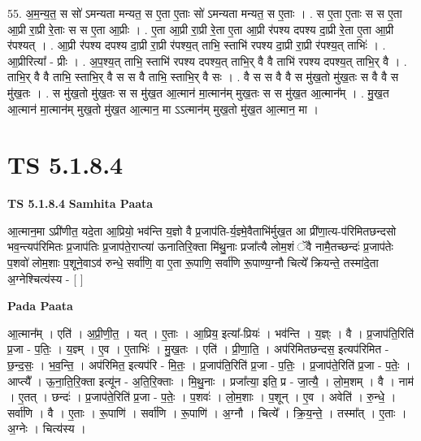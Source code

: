 \documentclass[17pt]{extarticle}
\begin{document}
55. अ॒म॒न्य॒त॒ स सो॑ ऽमन्यता मन्यत॒ स ए॒ता ए॒ताः सो॑ ऽमन्यता मन्यत॒ स ए॒ताः । . स ए॒ता ए॒ताः स स ए॒ता आ॒प्री रा॒प्री रे॒ताः स स ए॒ता आ॒प्रीः । . ए॒ता आ॒प्री रा॒प्री रे॒ता ए॒ता आ॒प्री र॑पश्य दपश्य दा॒प्री रे॒ता ए॒ता आ॒प्री र॑पश्यत् । . आ॒प्री र॑पश्य दपश्य दा॒प्री रा॒प्री र॑पश्य॒त् ताभि॒ स्ताभि॑ रपश्य दा॒प्री रा॒प्री र॑पश्य॒त् ताभिः॑ । . आ॒प्रीरित्या᳚ - प्रीः । . अ॒प॒श्य॒त् ताभि॒ स्ताभि॑ रपश्य दपश्य॒त् ताभि॒र् वै वै ताभि॑ रपश्य दपश्य॒त् ताभि॒र् वै । . ताभि॒र् वै वै ताभि॒ स्ताभि॒र् वै स स वै ताभि॒ स्ताभि॒र् वै सः । . वै स स वै वै स मु॑ख॒तो मु॑ख॒तः स वै वै स मु॑ख॒तः । . स मु॑ख॒तो मु॑ख॒तः स स मु॑ख॒त आ॒त्मान॑ मा॒त्मान॑म् मुख॒तः स स मु॑ख॒त आ॒त्मान᳚म् । . मु॒ख॒त आ॒त्मान॑ मा॒त्मान॑म् मुख॒तो मु॑ख॒त आ॒त्मान॒ मा ऽऽत्मान॑म् मुख॒तो मु॑ख॒त आ॒त्मान॒ मा । \newline
\pagebreak
{}

\section{ TS 5.1.8.4 }

\textbf{TS 5.1.8.4 } \newline
\textbf{Samhita Paata} \newline

आ॒त्मान॒मा ऽप्री॑णीत॒ यदे॒ता आ॒प्रियो॒ भव॑न्ति य॒ज्ञो वै प्र॒जाप॑ति-र्य॒ज्ञ्मे॒वैताभि॑र्मुख॒त आ प्री॑णा॒त्य-प॑रिमितछन्दसो भव॒न्त्यप॑रिमितः प्र॒जाप॑तिः प्र॒जाप॑ते॒राप्त्या॑ ऊनातिरि॒क्ता मि॑थु॒नाः प्रजा᳚त्यै लोम॒शं ॅवै नामै॒तच्छन्दः॑ प्र॒जाप॑तेः प॒शवो॑ लोम॒शाः प॒शूने॒वाऽव॑ रुन्धे॒ सर्वा॑णि॒ वा ए॒ता रू॒पाणि॒ सर्वा॑णि रू॒पाण्य॒ग्नौ चित्ये᳚ क्रियन्ते॒ तस्मा॑दे॒ता अ॒ग्नेश्चित्य॑स्य - [  ] \newline

\textbf{Pada Paata} \newline

आ॒त्मान᳚म् । एति॑ । अ॒प्री॒णी॒त॒ । यत् । ए॒ताः । आ॒प्रिय॒ इत्या᳚-प्रियः॑ । भव॑न्ति । य॒ज्ञ्ः । वै । प्र॒जाप॑ति॒रिति॑ प्र॒जा - प॒तिः॒ । य॒ज्ञ्म् । ए॒व । ए॒ताभिः॑ । मु॒ख॒तः । एति॑ । प्री॒णा॒ति॒ । अप॑रिमितछन्दस॒ इत्यप॑रिमित - छ॒न्द॒सः॒ । भ॒व॒न्ति॒ । अप॑रिमित॒ इत्यप॑रि - मि॒तः॒ । प्र॒जाप॑ति॒रिति॑ प्र॒जा - प॒तिः॒ । प्र॒जाप॑ते॒रिति॑ प्र॒जा - प॒तेः॒ । आप्त्यै᳚ । ऊ॒ना॒ति॒रि॒क्ता इत्यू॑न - अ॒ति॒रि॒क्ताः । मि॒थु॒नाः । प्रजा᳚त्या॒ इति॒ प्र - जा॒त्यै॒ । लो॒म॒शम् । वै । नाम॑ । ए॒तत् । छन्दः॑ । प्र॒जाप॑ते॒रिति॑ प्र॒जा - प॒तेः॒ । प॒शवः॑ । लो॒म॒शाः । प॒शून् । ए॒व । अवेति॑ । रु॒न्धे॒ । सर्वा॑णि । वै । ए॒ताः । रू॒पाणि॑ । सर्वा॑णि । रू॒पाणि॑ । अ॒ग्नौ । चित्ये᳚ । क्रि॒य॒न्ते॒ । तस्मा᳚त् । ए॒ताः । अ॒ग्नेः । चित्य॑स्य ।  \newline
\end{document}
